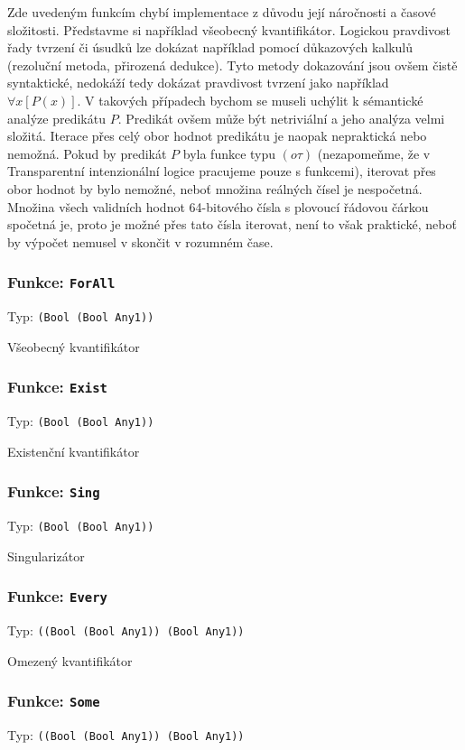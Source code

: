 Zde uvedeným funkcím chybí implementace z důvodu její náročnosti a časové složitosti. Představme si
například všeobecný kvantifikátor. Logickou pravdivost řady tvrzení či úsudků lze dokázat například
pomocí důkazových kalkulů (rezoluční metoda, přirozená dedukce). Tyto metody dokazování jsou ovšem
čistě syntaktické, nedokáží tedy dokázat pravdivost tvrzení jako například $\forall x[P(x)]$. V takových
případech bychom se museli uchýlit k sémantické analýze predikátu $P$.
Predikát ovšem může být netriviální a jeho analýza velmi složitá. Iterace přes celý obor hodnot
predikátu je naopak nepraktická nebo nemožná. Pokud by predikát $P$ byla funkce typu $(o\tau)$
(nezapomeňme, že v Transparentní intenzionální logice pracujeme pouze s funkcemi), iterovat přes
obor hodnot by bylo nemožné, neboť množina reálných čísel je nespočetná. Množina všech validních
hodnot 64-bitového čísla s plovoucí řádovou čárkou spočetná je, proto je možné přes tato čísla
iterovat, není to však praktické, neboť by výpočet nemusel v skončit v rozumném čase.

\subsubsection*{Funkce: \lstinline|ForAll|}
Typ: \lstinline|(Bool (Bool Any1))|

Všeobecný kvantifikátor

\subsubsection*{Funkce: \lstinline|Exist|}
Typ: \lstinline|(Bool (Bool Any1))|

Existenční kvantifikátor

\subsubsection*{Funkce: \lstinline|Sing|}
Typ: \lstinline|(Bool (Bool Any1))|

Singularizátor

\subsubsection*{Funkce: \lstinline|Every|}
Typ: \lstinline|((Bool (Bool Any1)) (Bool Any1))|

Omezený kvantifikátor

\subsubsection*{Funkce: \lstinline|Some|}
Typ: \lstinline|((Bool (Bool Any1)) (Bool Any1))|

